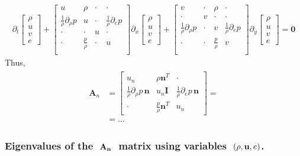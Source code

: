 \documentclass[letterpaper,10pt,english]{jupyterBook}
\begin{document}
\begin{equation*}
\begin{split}
\partial_t \begin{bmatrix} \rho \\ u \\ v \\ e \end{bmatrix} +
\begin{bmatrix}
  u & \rho  & \cdot & \cdot \\
  \frac{1}{\rho} \partial_\rho p & u & \cdot & \frac{1}{\rho} \partial_{e}p \\
  \cdot &  \cdot & u & \cdot \\
  \cdot &  \frac{p}{\rho} & \cdot & u \\
\end{bmatrix} \partial_x \begin{bmatrix} \rho \\ u \\ v \\ e \end{bmatrix} +
\begin{bmatrix}
  v & \cdot & \rho & \cdot  \\
  \cdot & v & \cdot & \cdot \\
  \frac{1}{\rho} \partial_\rho p & \cdot & v & \frac{1}{\rho} \partial_{e}p \\
  \cdot & \cdot & \frac{p}{\rho} & v \\
\end{bmatrix} \partial_y \begin{bmatrix} \rho \\ u \\ v \\ e \end{bmatrix} = \mathbf{0}
\end{split}
\end{equation*}
\sphinxAtStartPar
Thus,
\begin{equation*}
\begin{split}\begin{aligned}
\mathbf{A}_n 
& =
\begin{bmatrix}
  u_n & \rho \mathbf{n}^T & \cdot \\
  \frac{1}{\rho} \partial_\rho p \, \mathbf{n} & u_n \mathbf{I}  & \frac{1}{\rho} \partial_{e} p \, \mathbf{n} \\
  \cdot & \frac{p}{\rho} \mathbf{n}^T & u_n
\end{bmatrix} = \\
 & = \dots
\end{aligned}\end{split}
\end{equation*}\subsubsection*{Eigenvalues of the \protect\(\ \mathbf{A}_\mathbf{n} \ \protect\) matrix using variables \protect\(\ (\rho, \mathbf{u}, e )\protect\).}
\end{document}
